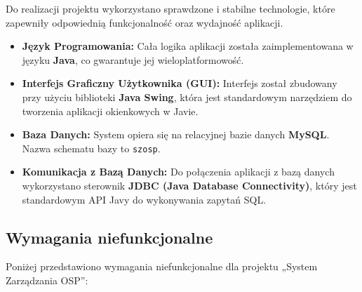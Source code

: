 Do realizacji projektu wykorzystano sprawdzone i stabilne technologie, które zapewniły odpowiednią funkcjonalność oraz wydajność aplikacji.
\begin{itemize}
    \item \textbf{Język Programowania:} Cała logika aplikacji została zaimplementowana w języku \textbf{Java}, co gwarantuje jej wieloplatformowość.
    \item \textbf{Interfejs Graficzny Użytkownika (GUI):} Interfejs został zbudowany przy użyciu biblioteki \textbf{Java Swing}, która jest standardowym narzędziem do tworzenia aplikacji okienkowych w Javie.
    \item \textbf{Baza Danych:} System opiera się na relacyjnej bazie danych \textbf{MySQL}. Nazwa schematu bazy to \texttt{szosp}.
    \item \textbf{Komunikacja z Bazą Danych:} Do połączenia aplikacji z bazą danych wykorzystano sterownik \textbf{JDBC (Java Database Connectivity)}, który jest standardowym API Javy do wykonywania zapytań SQL.
\end{itemize}



\subsection*{ Wymagania niefunkcjonalne}

Poniżej przedstawiono wymagania niefunkcjonalne dla projektu „System Zarządzania OSP”:

